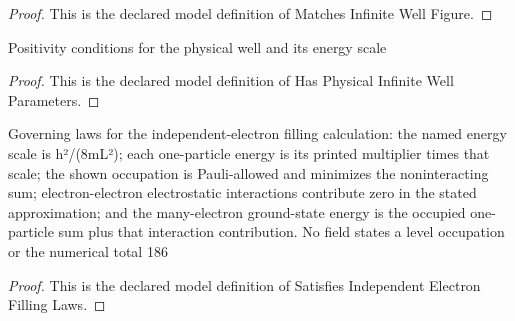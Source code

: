 \begin{proof}
  This is the declared model definition of Matches Infinite Well Figure.
\end{proof}
\begin{definition}
  \label{def:physics:phyx-mini-0580:phyxminiproblems-problemphyxmini0580-hasphysicalinfinitewellparameters}
  Positivity conditions for the physical well and its energy scale
\end{definition}
\begin{proof}
  This is the declared model definition of Has Physical Infinite Well Parameters.
\end{proof}
\begin{definition}
  \label{def:physics:phyx-mini-0580:phyxminiproblems-problemphyxmini0580-satisfiesindependentelectronfillinglaws}
  Governing laws for the independent-electron filling calculation: the named energy scale is h²/(8mL²); each one-particle energy is its printed multiplier times that scale; the shown occupation is Pauli-allowed and minimizes the noninteracting sum; electron-electron electrostatic interactions contribute zero in the stated approximation; and the many-electron ground-state energy is the occupied one-particle sum plus that interaction contribution. No field states a level occupation or the numerical total 186
\end{definition}
\begin{proof}
  This is the declared model definition of Satisfies Independent Electron Filling Laws.
\end{proof}
